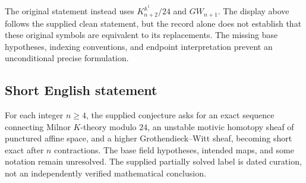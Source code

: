 \documentclass[11pt]{article}
\begin{document}
The original statement instead uses \(K^{\mathbb A^1}_{n+2}/24\) and \(GW_{n+1}\). The display above follows the supplied clean statement, but the record alone does not establish that these original symbols are equivalent to its replacements. The missing base hypotheses, indexing conventions, and endpoint interpretation prevent an unconditional precise formulation.
\subsection{Short English statement}
For each integer \(n\geq 4\), the supplied conjecture asks for an exact sequence connecting Milnor \(K\)-theory modulo \(24\), an unstable motivic homotopy sheaf of punctured affine space, and a higher Grothendieck--Witt sheaf, becoming short exact after \(n\) contractions. The base field hypotheses, intended maps, and some notation remain unresolved. The supplied partially solved label is dated curation, not an independently verified mathematical conclusion.
\end{document}
